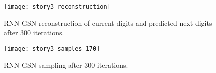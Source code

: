 \begin{figure}[h!]
  \centering
    \texttt{[image: story3\_reconstruction]}
\caption{RNN-GSN reconstruction of current digits and predicted next digits after 300 iterations.}
\end{figure}

\begin{figure}[h!]
  \centering
    \texttt{[image: story3\_samples\_170]}
\caption{RNN-GSN sampling after 300 iterations.}
\end{figure}